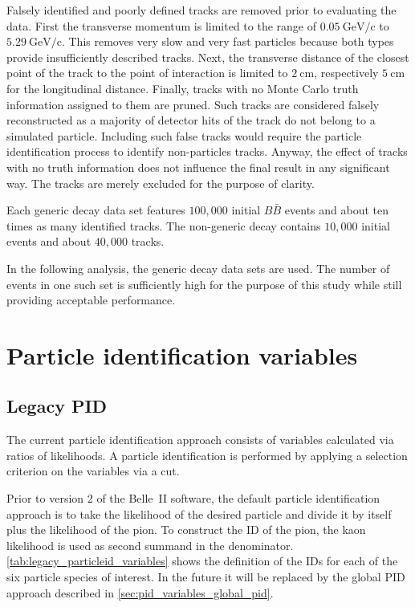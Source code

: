 Falsely identified and poorly defined tracks are removed prior to evaluating the data. First the transverse momentum is limited to the range of $0.05 \mathrm{~GeV/c}$ to $5.29 \mathrm{~GeV/c}$. This removes very slow and very fast particles because both types provide insufficiently described tracks. Next, the transverse distance of the closest point of the track to the point of interaction is limited to $2 \mathrm{~cm}$, respectively $5 \mathrm{~cm}$ for the longitudinal distance. Finally, tracks with no Monte Carlo truth information assigned to them are pruned. Such tracks are considered falsely reconstructed as a majority of detector hits of the track do not belong to a simulated particle. Including such false tracks would require the particle identification process to identify non-particles tracks. Anyway, the effect of tracks with no truth information does not influence the final result in any significant way. The tracks are merely excluded for the purpose of clarity.

Each generic decay data set features $100,000$ initial $B \bar{B}$ events and about ten times as many identified tracks. The non-generic decay contains $10,000$ initial events and about $40,000$ tracks.

In the following analysis, the generic decay data sets are used. The number of events in one such set is sufficiently high for the purpose of this study while still providing acceptable performance.

\section{Particle identification variables}
\label{sec:pid_variables}

\subsection{Legacy PID}
\label{sec:pid_variables_legacy_pid}

The current particle identification approach consists of variables calculated via ratios of likelihoods. A particle identification is performed by applying a selection criterion on the variables via a cut.

Prior to version 2 of the Belle~\RN{2} software, the default particle identification approach is to take the likelihood of the desired particle and divide it by itself plus the likelihood of the pion. To construct the ID of the pion, the kaon likelihood is used as second summand in the denominator. \autoref{tab:legacy_particleid_variables} shows the definition of the IDs for each of the six particle species of interest. In the future it will be replaced by the global PID approach described in \autoref{sec:pid_variables_global_pid}.

